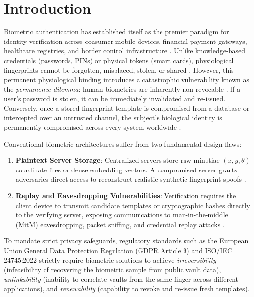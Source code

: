 \documentclass[conference]{IEEEtran}
\begin{document}
\section{Introduction}
Biometric authentication has established itself as the premier paradigm for identity verification across consumer mobile devices, financial payment gateways, healthcare registries, and border control infrastructure \cite{jain2008biometric,patel2015cancelable}. Unlike knowledge-based credentials (passwords, PINs) or physical tokens (smart cards), physiological fingerprints cannot be forgotten, misplaced, stolen, or shared \cite{ratha2007cancelable}. However, this permanent physiological binding introduces a catastrophic vulnerability known as the \textit{permanence dilemma}: human biometrics are inherently non-revocable \cite{patel2015cancelable}. If a user's password is stolen, it can be immediately invalidated and re-issued. Conversely, once a stored fingerprint template is compromised from a database or intercepted over an untrusted channel, the subject's biological identity is permanently compromised across every system worldwide \cite{ross2011visual}.

Conventional biometric architectures suffer from two fundamental design flaws:
\begin{enumerate}
    \item \textbf{Plaintext Server Storage}: Centralized servers store raw minutiae $(x, y, \theta)$ coordinate files or dense embedding vectors. A compromised server grants adversaries direct access to reconstruct realistic synthetic fingerprint spoofs \cite{ferrara2012mcc}.
    \item \textbf{Replay and Eavesdropping Vulnerabilities}: Verification requires the client device to transmit candidate templates or cryptographic hashes directly to the verifying server, exposing communications to man-in-the-middle (MitM) eavesdropping, packet sniffing, and credential replay attacks \cite{schnorr1991efficient}.
\end{enumerate}

To mandate strict privacy safeguards, regulatory standards such as the European Union General Data Protection Regulation (GDPR Article 9) \cite{gdpr2016} and ISO/IEC 24745:2022 \cite{iso24745} strictly require biometric solutions to achieve \textit{irreversibility} (infeasibility of recovering the biometric sample from public vault data), \textit{unlinkability} (inability to correlate vaults from the same finger across different applications), and \textit{renewability} (capability to revoke and re-issue fresh templates).
\end{document}
